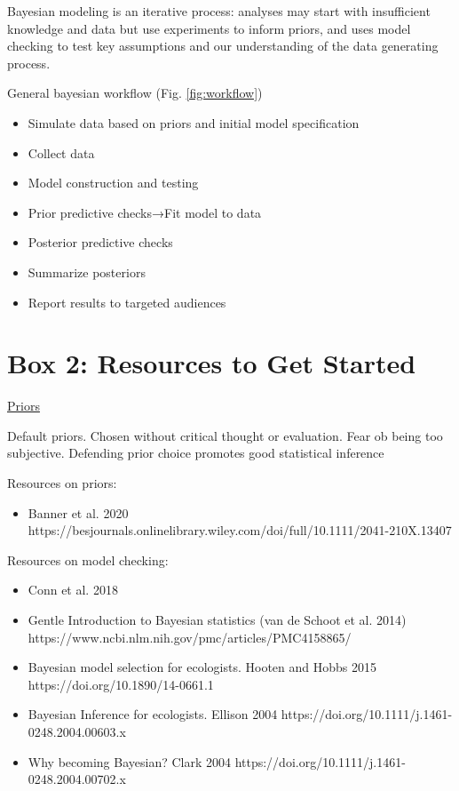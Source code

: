 \documentclass{article}
\begin{document}
\par Bayesian modeling is an iterative process: analyses may start with insufficient knowledge and data but use experiments to inform priors, and uses model checking to test key assumptions and our understanding of the data generating process.
\par General bayesian workflow (Fig. \ref{fig:workflow})
\begin{itemize}
\item Simulate data based on priors and initial model specification 
\item Collect data
\item Model construction and testing
\item Prior predictive checks→Fit model to data
\item Posterior predictive checks
\item Summarize posteriors
\item Report results to targeted audiences
\end{itemize}



\section* {Box 2: Resources to Get Started}
\underline{Priors}
\par Default priors. Chosen without critical thought or evaluation. Fear ob being too subjective. Defending prior choice promotes good statistical inference
\par Resources on priors: 

\begin{itemize}
\item Banner et al. 2020 https://besjournals.onlinelibrary.wiley.com/doi/full/10.1111/2041-210X.13407 
\end{itemize}

\par Resources on model checking:
\begin{itemize}
\item Conn et al. 2018 %
\item Gentle Introduction to Bayesian statistics (van de Schoot et al. 2014)
https://www.ncbi.nlm.nih.gov/pmc/articles/PMC4158865/
\item Bayesian model selection for ecologists. Hooten and Hobbs 2015
 https://doi.org/10.1890/14-0661.1
\item Bayesian Inference for ecologists. Ellison 2004
 https://doi.org/10.1111/j.1461-0248.2004.00603.x
\item Why becoming Bayesian? Clark 2004
 https://doi.org/10.1111/j.1461-0248.2004.00702.x

\end{itemize}
 
\end{document}
